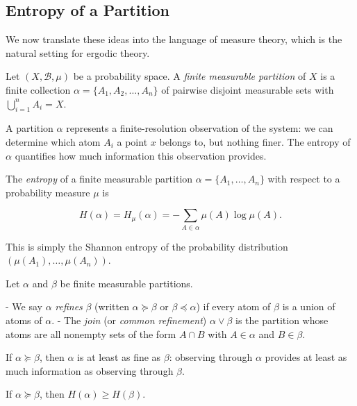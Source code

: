 \subsection{Entropy of a Partition}\label{sec:11.2.3}

We now translate these ideas into the language of measure theory, which is the natural setting for ergodic theory.

\begin{definition}\label{def:11.4}
Let $(X, \mathcal{B}, \mu)$ be a probability space. A \textit{finite measurable partition} of $X$ is a finite collection $\alpha = \{A_1, A_2, \ldots, A_n\}$ of pairwise disjoint measurable sets with $\bigcup_{i=1}^n A_i = X$.

A partition $\alpha$ represents a finite-resolution observation of the system: we can determine which atom $A_i$ a point $x$ belongs to, but nothing finer. The entropy of $\alpha$ quantifies how much information this observation provides.
\end{definition}


\begin{definition}\label{def:11.5}
The \textit{entropy} of a finite measurable partition $\alpha = \{A_1, \ldots, A_n\}$ with respect to a probability measure $\mu$ is

\[
H(\alpha) = H_\mu(\alpha) = -\sum_{A \in \alpha} \mu(A) \log \mu(A).
\]

This is simply the Shannon entropy of the probability distribution $(\mu(A_1), \ldots, \mu(A_n))$.
\end{definition}


\begin{definition}\label{def:11.6}
Let $\alpha$ and $\beta$ be finite measurable partitions.

- We say $\alpha$ \textit{refines} $\beta$ (written $\alpha \succeq \beta$ or $\beta \preceq \alpha$) if every atom of $\beta$ is a union of atoms of $\alpha$.
- The \textit{join} (or \textit{common refinement}) $\alpha \vee \beta$ is the partition whose atoms are all nonempty sets of the form $A \cap B$ with $A \in \alpha$ and $B \in \beta$.

If $\alpha \succeq \beta$, then $\alpha$ is at least as fine as $\beta$: observing through $\alpha$ provides at least as much information as observing through $\beta$.
\end{definition}


\begin{proposition}\label{prop:11.7.}
If $\alpha \succeq \beta$, then $H(\alpha) \geq H(\beta)$.
\end{proposition}


